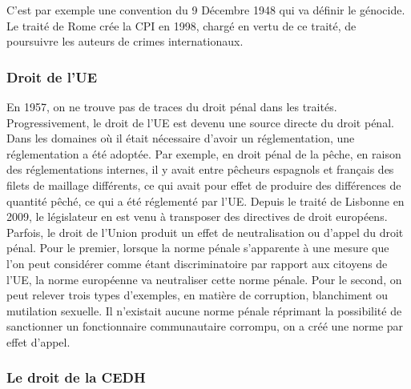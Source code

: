 \documentclass[10pt, a4paper, openany]{book}
\begin{document}
C'est par exemple une convention du 9 Décembre 1948 qui va définir le génocide. Le traité de Rome crée la CPI en 1998, chargé en vertu de ce traité, de poursuivre les auteurs de crimes internationaux. 

\subsubsection{Droit de l'UE}

En 1957, on ne trouve pas de traces du droit pénal dans les traités. Progressivement, le droit de l'UE est devenu une source directe du droit pénal. Dans les domaines où il était nécessaire d'avoir un réglementation, une réglementation a été adoptée. Par exemple, en droit pénal de la pêche, en raison des réglementations internes, il y avait entre pêcheurs espagnols et français des filets de maillage différents, ce qui avait pour effet de produire des différences de quantité pêché, ce qui a été réglementé par l'UE. Depuis le traité de Lisbonne en 2009, le législateur en est venu à transposer des directives de droit européens. \\
Parfois, le droit de l'Union produit un effet de neutralisation ou d'appel du droit pénal. Pour le premier, lorsque la norme pénale s'apparente à une mesure que l'on peut considérer comme étant discriminatoire par rapport aux citoyens de l'UE, la norme européenne va neutraliser cette norme pénale. Pour le second, on peut relever trois types d'exemples, en matière de corruption, blanchiment ou mutilation sexuelle. Il n'existait aucune norme pénale réprimant la possibilité de sanctionner un fonctionnaire communautaire corrompu, on a créé une norme par effet d'appel. 

\subsubsection{Le droit de la CEDH}
\end{document}

